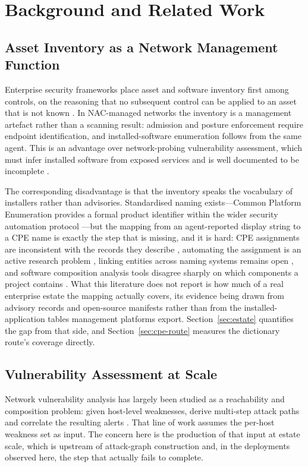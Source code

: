 \documentclass[fleqn,10pt,lineno]{wlpeerj}
\begin{document}
\section{Background and Related Work}
\label{sec:background}

\subsection{Asset Inventory as a Network Management Function}
Enterprise security frameworks place asset and software inventory first among controls, on the reasoning that no subsequent control can be applied to an asset that is not known \cite{cis,nistcsf}. In NAC-managed networks the inventory is a management artefact rather than a scanning result: admission and posture enforcement require endpoint identification, and installed-software enumeration follows from the same agent. This is an advantage over network-probing vulnerability assessment, which must infer installed software from exposed services and is well documented to be incomplete \cite{holm2011}.

The corresponding disadvantage is that the inventory speaks the vocabulary of installers rather than advisories. Standardised naming exists---Common Platform Enumeration provides a formal product identifier \cite{cpe} within the wider security automation protocol \cite{scap}---but the mapping from an agent-reported display string to a CPE name is exactly the step that is missing, and it is hard: CPE assignments are inconsistent with the records they describe \cite{sanguino2017}, automating the assignment is an active research problem \cite{hu2024,jiang2025vulcpe}, linking entities across naming systems remains open \cite{alfasi2024}, and software composition analysis tools disagree sharply on which components a project contains \cite{imtiaz2021,zhao2023}. What this literature does not report is how much of a real enterprise estate the mapping actually covers, its evidence being drawn from advisory records and open-source manifests rather than from the installed-application tables management platforms export. Section~\ref{sec:estate} quantifies the gap from that side, and Section~\ref{sec:cpe-route} measures the dictionary route's coverage directly.

\subsection{Vulnerability Assessment at Scale}
Network vulnerability analysis has largely been studied as a reachability and composition problem: given host-level weaknesses, derive multi-step attack paths \cite{sheyner2002,ou2011} and correlate the resulting alerts \cite{roschke2011}. That line of work assumes the per-host weakness set as input. The concern here is the production of that input at estate scale, which is upstream of attack-graph construction and, in the deployments observed here, the step that actually fails to complete.
\end{document}
